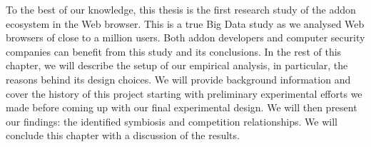 \documentclass[11pt,oneside]{book}
\begin{document}
To the best of our knowledge, this thesis is the first research study of the addon ecosystem in the Web browser. This is a true Big Data study as we analysed Web browsers of close to a million users. Both addon developers and computer security companies can benefit from this study and its conclusions. In the rest of this chapter, we will describe the setup of our empirical analysis, in particular, the reasons behind its design choices. We will provide background information and cover the history of this project starting with preliminary experimental efforts we made before coming up with our final experimental design. We will then present our findings: the identified symbiosis and competition relationships. We will conclude this chapter with a discussion of the results.

\end{document}
